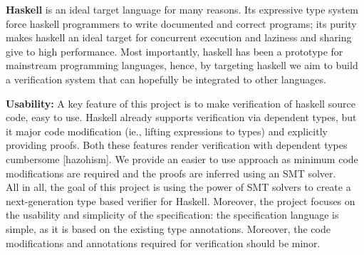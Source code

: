 \textbf{Haskell} is an ideal target language for many reasons.
Its expressive type system force haskell programmers to write documented and correct programs; 
its purity makes haskell an ideal target for concurrent execution and 
laziness and sharing give to high performance. 
Most importantly, haskell has been a prototype for mainstream programming languages,
hence, by targeting haskell we aim to build a verification system that can hopefully be integrated to other languages.



\textbf{Usability:}
A key feature of this project is to make verification of haskell source code, easy to use.
Haskell already supports verification via dependent types, but it 
major code modification (ie., lifting expressions to types)
and explicitly providing proofs.
Both these features render verification with dependent types cumbersome [hazohism].
%
We  provide an easier to use approach as 
minimum code modifications are required 
and the proofs are inferred using an SMT solver.
\\

All in all, the goal of this project is using the power of SMT solvers to 
create a next-generation type based verifier for Haskell.
Moreover, the project focuses on the usability and simplicity of the specification:
the specification language is simple, as it is based on the existing type annotations.
Moreover, the code modifications and annotations required for verification should be minor.




